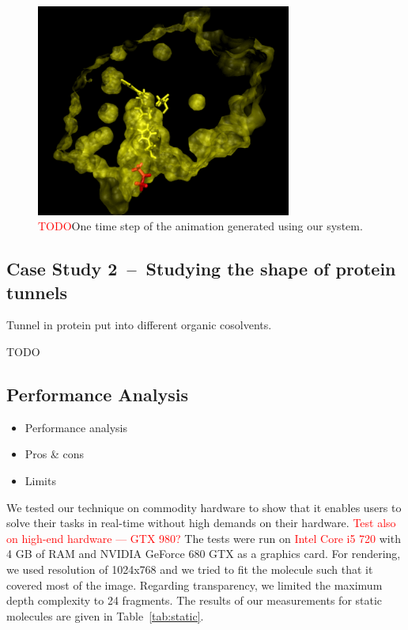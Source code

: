 \begin{figure}[htb]
  \centering
  \includegraphics[width=3.3in]{image/animation.png}
  \caption{\textcolor{red}{TODO}One time step of the animation generated using our system.}
	\label{fig:animation2}
\end{figure}


\subsection{Case Study 2~--~Studying the shape of protein tunnels}
Tunnel in protein put into different organic cosolvents.

TODO

\subsection{Performance Analysis}
\label{sec:performance}

\begin{itemize}
  \item Performance analysis
  \item Pros \& cons
  \item Limits
\end{itemize}

We tested our technique on commodity hardware to show that it enables users to solve their tasks in real-time without high demands on their hardware.
\textcolor{red}{Test also on high-end hardware --- GTX 980?}
The tests were run on \textcolor{red}{Intel Core i5 720} with 4 GB of RAM and NVIDIA GeForce 680 GTX as a graphics card.
For rendering, we used resolution of 1024x768 and we tried to fit the molecule such that it covered most of the image.
Regarding transparency, we limited the maximum depth complexity to 24 fragments.
The results of our measurements for static molecules are given in Table~\ref{tab:static}.

